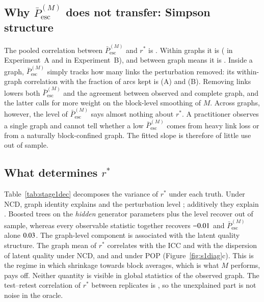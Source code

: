 \documentclass[11pt,a4paper]{article}
\theoremstyle{definition}
\theoremstyle{remark}
\newcommand{\Pbar}{\bar P^{(M)}_{\mathrm{esc}}}
\begin{document}
\subsection{Why \texorpdfstring{$\Pbar$}{P̄} does not transfer: Simpson structure}
The pooled correlation between $\Pbar$ and $r^*$ is \SOnePooled. Within graphs it is \SOneWithin{}
(\SOneWithinA{} in Experiment~A and \SOneWithinB{} in Experiment~B), and between graph means it is
\SOneBetween. Inside a graph, $\Pbar$ simply tracks how many links the perturbation removed: its
within-graph correlation with the fraction of arcs kept is \SOnePkeepA{} (A) and \SOnePkeepB{} (B).
Removing links lowers both $\Pbar$ and the agreement between observed and complete graph, and the
latter calls for more weight on the block-level smoothing of $M$. Across graphs, however, the level of
$\Pbar$ says almost nothing about $r^*$. A practitioner observes a single graph and cannot tell whether
a low $\Pbar$ comes from heavy link loss or from a naturally block-confined graph. The fitted slope is
therefore of little use out of sample.

\subsection{What determines \texorpdfstring{$r^*$}{r*}}
Table~\ref{tab:stage1dec} decomposes the variance of $r^*$ under each truth. Under NCD, graph identity
explains \SOneDecBase{} and the perturbation level \SOneDecLevel{}; additively they explain \SOneDecBL.
Boosted trees on the \emph{hidden} generator parameters plus the level recover \SOneDecHidden{} out of
sample, whereas every observable statistic together recovers $-0.01$ and $\Pbar$ alone
$0.03$. The graph-level component is associated with the latent quality structure. The graph mean
of $r^*$ correlates \SOneCorrICC{} with the ICC and \SOneCorrFit{} with the dispersion of latent quality
under NCD, and \SOneCorrICCPop{} and \SOneCorrFitPop{} under POP (Figure~\ref{fig:s1diag}c). This is
the regime in which shrinkage towards block averages, which is what
$M$ performs, pays off. Neither quantity is visible in global statistics of the observed graph. The
test--retest correlation of $r^*$ between replicates is \SOneRetest, so the unexplained part is not
noise in the oracle.


\end{document}
